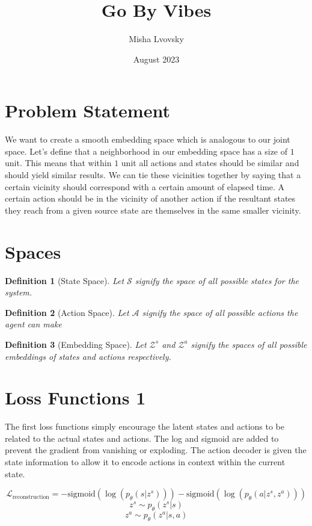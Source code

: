 \documentclass{article}
\title{Go By Vibes}
\author{Misha Lvovsky}
\date{August 2023}
\newtheorem{definition}{Definition}
\begin{document}
\maketitle

\section{Problem Statement}

We want to create a smooth embedding space which is analogous to our joint space.
Let's define that a neighborhood in our embedding space has a size of $1$ unit. This means that within $1$ unit all actions and states should be similar and should yield similar results. We can tie these vicinities together by saying that a certain vicinity should correspond with a certain amount of elapsed time. A certain action should be in the vicinity of another action if the resultant states they reach from a given source state are themselves in the same smaller vicinity.

\section{Spaces}

\begin{definition} [State Space] Let $\mathcal{S}$ signify the space of all possible states for the system.
\end{definition}
\begin{definition} [Action Space]
    Let $\mathcal{A}$ signify the space of all possible actions the agent can make
\end{definition}
\begin{definition} [Embedding Space]
Let $\mathcal{Z}^s$ and $\mathcal{Z}^a$ signify the spaces of all possible embeddings of states and actions respectively.
\end{definition}

\section{Loss Functions 1}

The first loss functions simply encourage the latent states and actions to be related to the actual states and actions.
The log and sigmoid are added to prevent the gradient from vanishing or exploding.
The action decoder is given the state information to allow it to encode actions in context within the current state.

$$\mathcal{L}_\text{reconstruction} = -\text{sigmoid}(\log(p_\theta(s|z^s))) - \text{sigmoid}(\log(p_\theta(a|z^s,z^a)))$$
$$z^s \sim p_\theta(z^s | s)$$
$$z^a \sim p_\theta(z^a | s, a)$$
\end{document}
